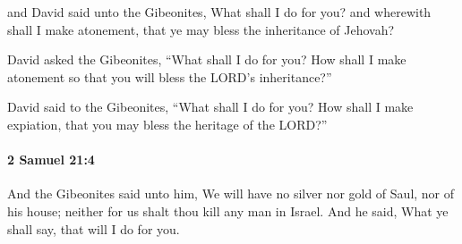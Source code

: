 			\begin{versebox}
					\item[BHS] 
					\item[ASV] and David said unto the Gibeonites, What shall I do for you? and wherewith shall I make atonement, that ye may bless the inheritance of Jehovah?
					\item[NIV] David asked the Gibeonites, “What shall I do for you? How shall I make atonement so that you will bless the LORD’s inheritance?”
					\item[NRSV] David said to the Gibeonites, “What shall I do for you? How shall I make expiation, that you may bless the heritage of the LORD?”
			\end{versebox}

		\paragraph{2 Samuel 21:4} %
			\label{2SAMUEL-21-4}

			And the Gibeonites said unto him, We will have no silver nor gold of Saul, nor of his house; neither for us shalt thou kill any man in Israel. And he said, What ye shall say, that will I do for you.

